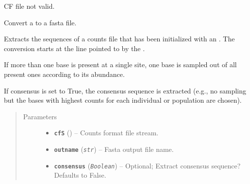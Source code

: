\documentclass[letterpaper,10pt,english]{sphinxmanual}
\begin{document}

\begin{fulllineitems}
\label{cf:libPoMo.cf.NotACountsFormatFileError}
CF file not valid.

\end{fulllineitems}


\begin{fulllineitems}
\label{cf:libPoMo.cf.cf_to_fasta}
Convert a {\hyperref[cf:libPoMo.cf.CFStream]{}} to a fasta file.

Extracts the sequences of a counts file that has been initialized
with an {\hyperref[cf:libPoMo.cf.CFStream]{}}.  The conversion starts at the line
pointed to by the {\hyperref[cf:libPoMo.cf.CFStream]{}}.

If more than one base is present at a single site, one base is
sampled out of all present ones according to its abundance.

If consensus is set to True, the consensus sequence is extracted
(e.g., no sampling but the bases with highest counts for each
individual or population are chosen).
\begin{quote}\begin{description}
\item[{Parameters}] \leavevmode\begin{itemize}
\item {} 
\textbf{\texttt{cfS}} ({\hyperref[cf:libPoMo.cf.CFStream]{}}) -- Counts format file stream.

\item {} 
\textbf{\texttt{outname}} (\emph{\texttt{str}}) -- Fasta output file name.

\item {} 
\textbf{\texttt{consensus}} (\emph{\texttt{Boolean}}) -- Optional; Extract consensus sequence?
Defaults to False.

\end{itemize}

\end{description}\end{quote}

\end{fulllineitems}
\end{document}

